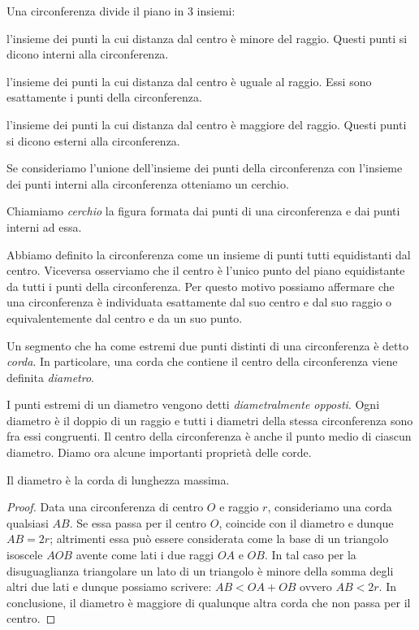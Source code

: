 \osservazione Una circonferenza divide il piano in 3 insiemi:
\begin{itemize*}
\item l'insieme dei punti la cui distanza dal centro è minore del raggio. Questi punti si dicono interni alla circonferenza.
\item l'insieme dei punti la cui distanza dal centro è uguale al raggio. Essi sono esattamente i punti della circonferenza.
\item l'insieme dei punti la cui distanza dal centro è maggiore del raggio. Questi punti si dicono esterni alla circonferenza.
\end{itemize*}

Se consideriamo l'unione dell'insieme dei punti della circonferenza con l'insieme dei punti interni alla circonferenza otteniamo un cerchio.

\begin{definizione}
Chiamiamo \emph{cerchio} la figura formata dai punti di una circonferenza e dai punti interni ad essa.
\end{definizione}

Abbiamo definito la circonferenza come un insieme di punti tutti equidistanti dal centro. Viceversa osserviamo che il centro è l’unico punto del piano equidistante da tutti i punti della circonferenza. Per questo motivo possiamo affermare che una circonferenza è individuata esattamente dal suo centro e dal suo raggio o equivalentemente dal centro e da un suo punto.

\begin{definizione}
Un segmento che ha come estremi due punti distinti di una circonferenza è detto \emph{corda}. In particolare, una corda che contiene il centro della circonferenza viene definita \emph{diametro}.
\end{definizione}

I punti estremi di un diametro vengono detti \emph{diametralmente opposti}.
Ogni diametro è il doppio di un raggio e tutti i diametri della stessa circonferenza sono fra essi congruenti. Il centro della circonferenza è anche il punto medio di ciascun diametro.
Diamo ora alcune importanti proprietà delle corde.

\begin{teorema}
Il diametro è la corda di lunghezza massima.
\end{teorema}

\begin{proof}
Data una circonferenza di centro $O$ e raggio $r$, consideriamo una corda qualsiasi $AB$. Se essa passa per il centro $O$, coincide con il diametro e dunque $AB=2r$; altrimenti essa può essere considerata come la base di un triangolo isoscele $AOB$ avente come lati i due raggi $OA$ e $OB$. In tal caso per la disuguaglianza triangolare un lato di un triangolo è minore della somma degli altri due lati e dunque possiamo scrivere: $AB < OA + OB$ ovvero $AB < 2r$.
In conclusione, il diametro è maggiore di qualunque altra corda che non passa per il centro.
\end{proof}

